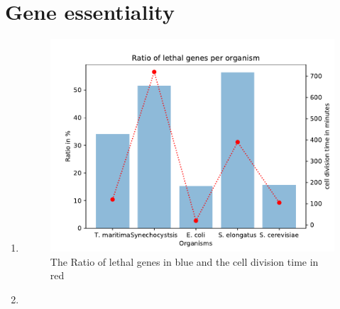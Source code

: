 \documentclass{scrartcl}
\begin{document}
\section{Gene essentiality}
\begin{enumerate}
	\item 
	\begin{figure}[H]
		\centering
		\includegraphics[max width=\linewidth]{Figure_question4.pdf}
		\caption{The Ratio of lethal genes in blue and the cell division time in red}
	\end{figure}
	\item 
\end{enumerate}
\end{document}
